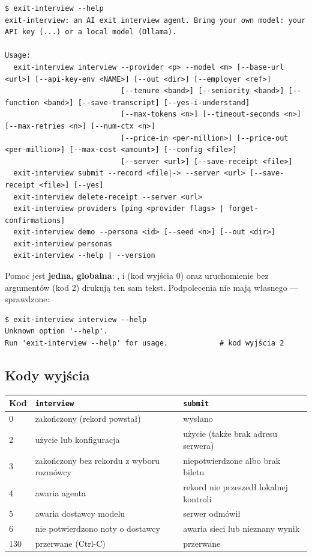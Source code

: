 {\begin{Verbatim}[fontsize=\scriptsize,frame=single,framesep=2mm]
$ exit-interview --help
exit-interview: an AI exit interview agent. Bring your own model: your API key (...) or a local model (Ollama).

Usage:
  exit-interview interview --provider <p> --model <m> [--base-url <url>] [--api-key-env <NAME>] [--out <dir>] [--employer <ref>]
                           [--tenure <band>] [--seniority <band>] [--function <band>] [--save-transcript] [--yes-i-understand]
                           [--max-tokens <n>] [--timeout-seconds <n>] [--max-retries <n>] [--num-ctx <n>]
                           [--price-in <per-million>] [--price-out <per-million>] [--max-cost <amount>] [--config <file>]
                           [--server <url>] [--save-receipt <file>]
  exit-interview submit --record <file|-> --server <url> [--save-receipt <file>] [--yes]
  exit-interview delete-receipt --server <url>
  exit-interview providers [ping <provider flags> | forget-confirmations]
  exit-interview demo --persona <id> [--seed <n>] [--out <dir>]
  exit-interview personas
  exit-interview --help | --version
\end{Verbatim}

Pomoc jest \textbf{jedna, globalna}: ,  i
 (kod wyjścia 0) oraz uruchomienie bez argumentów (kod 2)
drukują ten sam tekst. Podpolecenia nie mają własnego  ---
sprawdzone:

\begin{Verbatim}[fontsize=\scriptsize,frame=single,framesep=2mm]
$ exit-interview interview --help
Unknown option '--help'.
Run 'exit-interview --help' for usage.            # kod wyjścia 2
\end{Verbatim}

\subsection{Kody wyjścia}

\begin{center}
\small
\begin{tabularx}{\linewidth}{@{}l>{\raggedright\arraybackslash}X>{\raggedright\arraybackslash}X@{}}
\toprule
Kod & \texttt{interview} & \texttt{submit} \\
\midrule
0 & zakończony (rekord powstał) & wysłano \\
2 & użycie lub konfiguracja & użycie (także brak adresu serwera) \\
3 & zakończony bez rekordu z wyboru rozmówcy & niepotwierdzone albo brak biletu \\
4 & awaria agenta & rekord nie przeszedł lokalnej kontroli \\
5 & awaria dostawcy modelu & serwer odmówił \\
6 & nie potwierdzono noty o dostawcy & awaria sieci lub nieznany wynik \\
130 & przerwane (Ctrl-C) & przerwane \\
\bottomrule
\end{tabularx}
\end{center}

}
